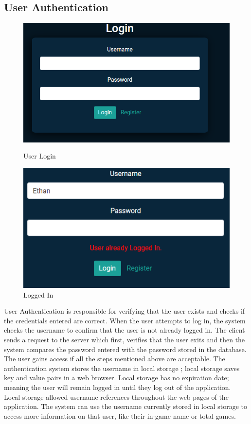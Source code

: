 \newpage
\subsection{User Authentication}

\begin{figure}[H]	
	\centering
	\includegraphics[width=\textwidth/2,height=\textheight,keepaspectratio]{img/Login.png}
	\caption{User Login}
	\label{tikz:login}
	\centering
	\includegraphics[width=\textwidth/2,height=\textheight,keepaspectratio]{img/LoggedIn.png}
	\caption{Logged In}
	\label{tikz:loggedin}
\end{figure}

User Authentication is responsible for verifying that the user exists and checks if the credentials entered are correct. When the user attempts to log in, the system checks the username to confirm that the user is not already logged in. The client sends a request to the server which first, verifies that the user exits and then the system compares the password entered with the password stored in the database. The user gains access if all the steps mentioned above are acceptable.\hfill \break
The authentication system stores the username in local storage \cite{casario2011html5}; local storage saves key and value pairs in a web browser. Local storage has no expiration date; meaning the user will remain logged in until they log out of the application. Local storage allowed username references throughout the web pages of the application. The system can use the username currently stored in local storage to access more information on that user, like their in-game name or total games.

